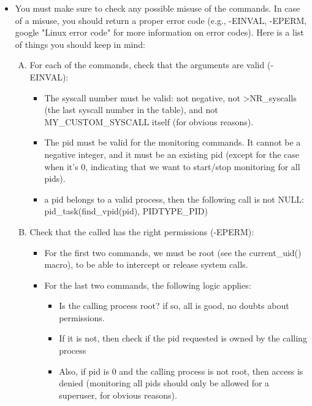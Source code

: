 \documentclass[12pt]{article}
\begin{document}
\begin{itemize}
    \item

    You must make sure to check any possible misuse of the commands. In case of
    a misuse, you should return a proper error code (e.g., -EINVAL, -EPERM, google
    "Linux error code" for more information on error codes). Here is a list of
    things you should keep in mind:

    \bigskip

    \begin{enumerate}[A.]
    \item For each of the commands, check that the arguments are valid (-EINVAL):
    \begin{itemize}
        \item The syscall number must be valid: not negative, not \textgreater  NR\_syscalls (the last syscall number in the table), and not MY\_CUSTOM\_SYSCALL itself (for obvious reasons).
        \item The pid must be valid for the monitoring commands. It cannot be a negative integer, and it must be an existing pid (except for the case when it's 0, indicating that we want to start/stop monitoring for all pids).
        \item  a pid belongs to a valid process, then the following call is not NULL:
        pid\_task(find\_vpid(pid), PIDTYPE\_PID)
    \end{itemize}
    \item Check that the called has the right permissions (-EPERM):
    \begin{itemize}
        \item For the first two commands, we must be root (see the current\_uid() macro), to be able to intercept or release system calls.
        \item For the last two commands, the following logic applies:
    \begin{itemize}
        \item Is the calling process root? if so, all is good, no doubts about permissions.
        \item If it is not, then check if the pid requested is owned by the calling process
        \item Also, if pid is 0 and the calling process is not root, then access is denied (monitoring all pids should only be allowed for a superuser, for obvious reasons).
    \end{itemize}
    \end{itemize}

\end{enumerate}
\end{itemize}
\end{document}

